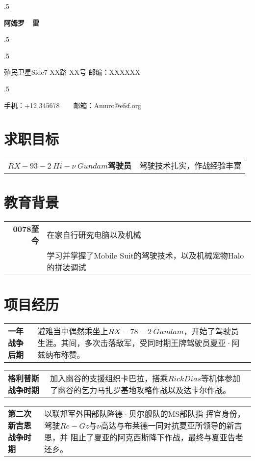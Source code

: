 \documentclass[a4paper, 10pt]{ctexart}
\begin{document}
\pagestyle{empty} 
\moveleft.5\hoffset\centerline{\huge\bf 阿姆罗~~雷} 
\moveleft.5\hoffset\centerline{}
\moveleft.5\hoffset\centerline{\small 殖民卫星Side7 XX路 XX号 邮编：XXXXXX }
\moveleft.5\hoffset\centerline{\small 手机：+12 345678~~~~邮箱：Amuro@efsf.org}

\section{求职目标}
\noindent
\begin{tabular}{rp{11.5cm}}
\textbf{$RX-93-2~Hi-\nu~Gundam$驾驶员}&驾驶技术扎实，作战经验丰富
\end{tabular}

\section{教育背景}
\noindent
\begin{tabular}{rp{11.5cm}}
\textbf{0078至今}&在家自行研究电脑以及机械\\
&学习并掌握了Mobile Suit的驾驶技术，以及机械宠物Halo的拼装调试
\end{tabular}                                                                

\section{项目经历}
\noindent
\begin{tabular}{p{2.4cm}|p{11cm}}
\textbf{一年战争后期}&避难当中偶然乘坐上$RX-78-2~Gundam$，开始了驾驶员
生涯。其间，多次击落敌军，受同时期王牌驾驶员夏亚·阿兹纳布称赞。\\
\end{tabular}

\noindent
\begin{tabular}{p{2.4cm}|p{11cm}}
\textbf{格利普斯战争时期}&加入幽谷的支援组织卡巴拉，搭乘$Rick Dias$等机体参加了幽谷的乞力马扎罗基地攻略作战以及达卡尔作战。\\
\end{tabular}

\noindent
\begin{tabular}{p{2.4cm}|p{11cm}}
\textbf{第二次新吉恩战争时期}&以联邦军外围部队隆德·贝尔舰队的MS部队指
挥官身份，驾驶$Re-Gz$与$\nu$高达与布莱德一同对抗夏亚所领导的新吉恩，并
阻止了夏亚的阿克西斯降下作战，最终与夏亚告老还乡。
\end{tabular}
\end{document}
